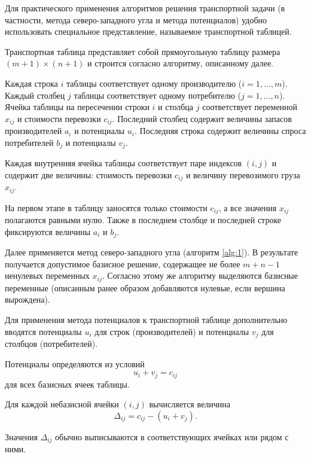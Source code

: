 \documentclass[12pt]{article}
\theoremstyle{definition}
\theoremstyle{plain}
\theoremstyle{definition}
\begin{document}
Для практического применения алгоритмов решения транспортной задачи
(в частности, метода северо-западного угла и метода потенциалов)
удобно использовать специальное представление,
называемое транспортной таблицей\cite{conf3}.

Транспортная таблица представляет собой прямоугольную таблицу
размера $(m+1) \times (n+1)$ и строится согласно алгоритму, описанному далее.

Каждая строка $i$ таблицы соответствует одному производителю ($i = 1,\dots,m$).
Каждый столбец $j$ таблицы соответствует одному потребителю ($j = 1,\dots,n$).
Ячейка таблицы на пересечении строки $i$ и столбца $j$
соответствует переменной $x_{ij}$ и стоимости перевозки $c_{ij}$.
Последний столбец содержит величины запасов производителей $a_i$ и потенциалы $u_i$.
Последняя строка содержит величины спроса потребителей $b_j$ и потенциалы $v_j$.

Каждая внутренняя ячейка таблицы соответствует паре индексов $(i,j)$
и содержит две величины: стоимость перевозки $c_{ij}$ и величину перевозимого груза $x_{ij}$.


На первом этапе в таблицу заносятся только стоимости $c_{ij}$,
а все значения $x_{ij}$ полагаются равными нулю.
Также в последнем столбце и последней строке фиксируются величины
$a_i$ и $b_j$.

Далее применяется метод северо-западного угла (алгоритм \ref{alg:1}).
В результате получается допустимое базисное решение,
содержащее не более $m+n-1$ ненулевых переменных $x_{ij}$.
Согласно этому же алгоритму выделяются базисные переменные (описанным ранее
образом добавляются нулевые, если вершина вырождена).

Для применения метода потенциалов к транспортной таблице
дополнительно вводятся потенциалы $u_i$ для строк (производителей)
и потенциалы $v_j$ для столбцов (потребителей).

Потенциалы определяются из условий
\[
u_i + v_j = c_{ij}
\]
для всех базисных ячеек таблицы.

Для каждой небазисной ячейки $(i,j)$ вычисляется величина
\[
\Delta_{ij} = c_{ij} - (u_i + v_j).
\]

Значения $\Delta_{ij}$ обычно выписываются в соответствующих ячейках
или рядом с ними.
\end{document}
